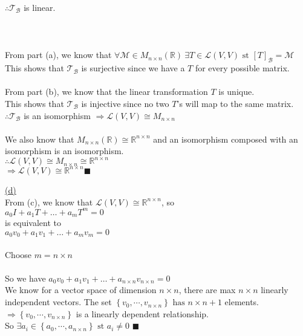 \documentclass[12pt]{article}
\newcommand{\R}{\mathbb{R}}
\renewcommand{\qed}{\hfill$\blacksquare$}
\begin{document}
$\therefore \mathcal{T}_\mathcal{B}$ is linear.
	\\\\\\\\
	From part (a), we know that $\forall \mathcal{M} \in M_{n\times n} (\mathbb{R}) \ \exists T \in \mathcal{L}(V,V) \text{ st } [T]_\mathcal{B} = \mathcal{M}$\\
	This shows that $\mathcal{T}_\mathcal{B}$ is surjective since we have a $T$ for every possible matrix.
	\\\\
	From part (b), we know that the linear transformation $T$ is unique.\\
	This shows that $\mathcal{T}_\mathcal{B}$ is injective since no two $T$'s will map to the same matrix.\\
$\therefore \mathcal{T}_\mathcal{B} $ is an isomorphism $\Longrightarrow \mathcal{L}(V,V) \cong  M_{n\times n}$
	\\\\
	We also know that $M_{n\times n}(\mathbb{R}) \cong \R^{n\times n} $ and an isomorphism composed with an isomorphism is an isomorphism.\\
$\therefore  \mathcal{L}(V,V) \cong  M_{n\times n} \cong \R^{n\times n}$ \\
$\Longrightarrow \mathcal{L}(V,V) \cong \R^{n\times n}$\qed

	\newpage
	\hyperlink{toc}{\hypertarget{4.4}{(d)}}\\
	From (c), we know that $\mathcal{L}(V,V) \cong \R^{n\times n}$, so \\
$a_0I + a_1T + \ldots + a_mT^m = 0$\\
	is equivalent to\\
$a_0v_0 + a_1v_1 + \ldots + a_mv_m = 0$
	\\\\
	Choose $m = n\times n$
	\\\\
	So we have $a_0v_0 + a_1v_1 + \ldots + a_{n\times n}v_{n\times n}= 0$\\
	We know for a vector space of dimension $n\times n$, there are max $n\times n$ linearly independent vectors.
	The set $\left\{ v_0, \cdots, v_{n\times n}\right\} \text{ has } n\times n + 1$ elements.\\
$\Longrightarrow \left\{ v_0, \cdots, v_{n\times n}\right\}$ is a linearly dependent relationship.\\
	So $\exists a_i \in \left\{ a_0, \cdots, a_{n\times n} \right\} \text{ st } a_i \not = 0$ \qed
\end{document}
